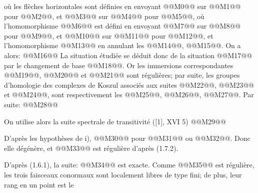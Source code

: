 
où les
flèches horizontales sont définies en envoyant @@M0@@ sur @@M1@@ pour @@M2@@, et @@M3@@ sur @@M4@@ pour @@M5@@, où l'homomorphisme @@M6@@ est défini en envoyant @@M7@@ sur @@M8@@ pour @@M9@@, et @@M10@@ sur @@M11@@ pour @@M12@@, et l'homomorphisme @@M13@@ en annulant les @@M14@@, @@M15@@. On a alors:
@@M16@@
La situation étudiée se déduit donc de la situation @@M17@@ par le changement de base @@M18@@. Or les immersions correspondantes @@M19@@, @@M20@@ et @@M21@@ sont régulières; par suite, les groupes d'homologie des complexes de Koszul associés aux suites @@M22@@, @@M23@@ et @@M24@@, sont respectivement les @@M25@@, @@M26@@, @@M27@@. Par suite:
@@M28@@

On utilise alors la suite spectrale de transitivité ([1], XVI 5)
@@M29@@

D'après les hypothèses de i), @@M30@@ pour @@M31@@ ou @@M32@@. Donc elle dégénère, et @@M33@@ est régulière d'après (1.7.2).

D'après (1.6.1), la suite:
@@M34@@
est exacte. Comme @@M35@@ est régulière, les trois faisceaux conormaux sont localement libres de type fini; de plus, leur rang en un point est le
